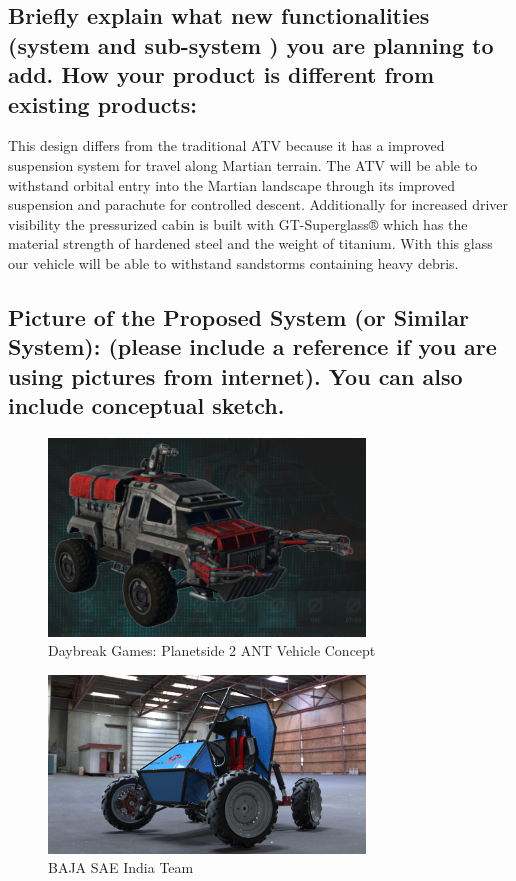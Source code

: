 \subsection{Briefly explain what new functionalities (system and sub-system ) you are planning to add. How your product is different from existing products:}

This design differs from the traditional ATV because it has a improved suspension system for travel along Martian terrain. The ATV will be able to withstand orbital entry into the Martian landscape through its improved suspension and parachute for controlled descent. Additionally for increased driver visibility the pressurized cabin is built with GT-Superglass® which has the material strength of hardened steel and the weight of titanium. With this glass our vehicle will be able to withstand sandstorms containing heavy debris.

\subsection{Picture of  the Proposed System (or Similar System): (please include a reference if you are using pictures from internet). You can also include conceptual sketch.}
\begin{figure}[!ht]
\centering
\includegraphics[width=0.75\textwidth]{a-1-1-ProjectIdeation/b-1-ProjectProposal/c-1-Images/Planetside.png} 
\caption{Daybreak Games: Planetside 2 ANT Vehicle Concept}
\end{figure}

\begin{figure}[!ht]
\centering
\includegraphics[width=0.75\textwidth]{a-1-1-ProjectIdeation/b-1-ProjectProposal/c-1-Images/BAJA.jpeg} 
\caption{BAJA SAE India Team}
\end{figure}
